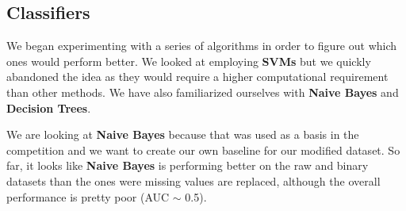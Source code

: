 \documentclass[a4paper,11pt]{article}
\begin{document}
\subsection{Classifiers}
We began experimenting with a series of algorithms in order to figure out which ones would perform better. We looked at employing \textbf{SVMs} but we quickly abandoned the idea as they would require a higher computational requirement than other methods. We have also familiarized ourselves with \textbf{Naive Bayes} and \textbf{Decision Trees}.

We are looking at \textbf{Naive Bayes} because that was used as a basis in the competition and we want to create our own baseline for our modified dataset. So far, it looks like \textbf{Naive Bayes} is performing better on the raw and binary datasets than the ones were missing values are replaced, although the overall performance is pretty poor (AUC $\sim$ 0.5).
\end{document}
